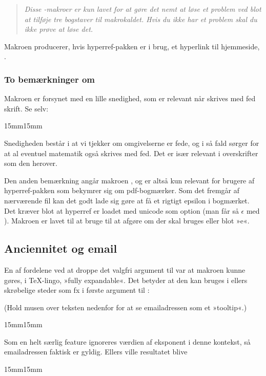 \documentclass[a4paper,article,oneside]{memoir}
\newcommand{\pakkenavn}[1]{\textsf{#1}}
\newcommand*{\optionname}[1]{\textcolor{option}{#1}}
\newenvironment{resultat}{%
  \begin{adjustwidth}{15mm}{15mm}%
    \begin{qshade}%
    }{%
    \end{qshade}%
  \end{adjustwidth}}
\begin{document}
\begin{quote}
  \itshape  Disse -makroer er kun lavet for at gøre det nemt at løse
  et problem ved blot at tilføje tre bogstaver til makrokaldet. Hvis
  du ikke har et problem skal du ikke prøve at løse det.
\end{quote}

Makroen  producerer, hvis \pakkenavn{hyperref}-pakken er i
brug, et hyperlink til \TKETs hjemmeside, \TKurl.

\subsubsection{To bemærkninger om \RemToRpdf}
\label{sec:bemarkn-om-remt}

Makroen  er forsynet med en lille snedighed, som er
relevant når \RemToR skrives med fed skrift. Se selv:


\begin{resultat}

\end{resultat}

Snedigheden består i at vi tjekker om omgivelserne er fede, og i så
fald sørger for at al eventuel matematik også skrives med fed. Det er
især relevant i overskrifter som den herover.

Den anden bemærkning angår makroen , og er altså kun
relevant for brugere af \pakkenavn{hyperref}-pakken som bekymrer sig
om pdf-bogmærker. Som det fremgår af nærværende fil kan det godt lade
sig gøre at få et rigtigt epsilon i bogmærket. Det kræver blot at
\pakkenavn{hyperref} er loadet med \optionname{unicode} som option
(man får så $\epsilon$ med ). Makroen 
er lavet til at bruge  til at afgøre om der skal
bruges  eller blot »e«.

\subsection{Anciennitet og email}
\label{sec:anciennitet-og-email}

En af fordelene ved at droppe det valgfri argument til 
var at makroen kunne gøres, i \TeX-lingo, »fully expandable«. Det
betyder at den kan bruges i ellers skrøbelige steder som fx i første
argument til :

(Hold musen over teksten nedenfor for at se emailadressen som et »tooltip«.)
\begin{resultat}

\end{resultat}
Som en helt særlig feature ignoreres værdien af \optionname{eksponent}
i denne kontekst, så emailadressen faktisk er gyldig. Ellers ville
resultatet blive
\begin{resultat}

\end{resultat}
\end{document}
